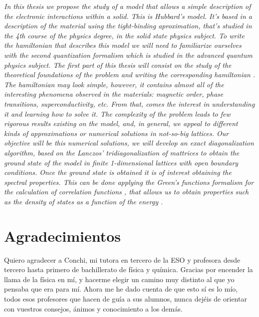 \documentclass[12pt,twoside]{article}
\begin{document}
\emph{In this thesis we propose the study of a model that allows a simple description of the electronic interactions within a solid. This is Hubbard's model. It's based in a description of the material using the tight-binding aproximation, that's studied in the 4th course of the physics degree, in the solid state physics subject. To write the hamiltonian that describes this model we will need to familiarize ourselves with the second quantization formalism which is studied in the advanced quantum physics subject. The first part of this thesis will consist on the study of the theoretical foundations of the problem and writing the corresponding hamiltonian \cite{alma9947259002101}. The hamiltonian may look simple, however, it contains almost all of the interesting phenomena observed in the materials: magnetic order, phase transitions, superconductivity, etc. From that, comes the interest in understanding it and learning how to solve it. The complexity of the problem leads to few rigorous results existing on the model, and, in general, we appeal to different kinds of approximations or numerical solutions in not-so-big lattices. Our objective will be this numerical solutions, we will develop an exact diagonalization algorithm, based on the Lanczos' tridiagonalization of mattrices to obtain the ground state of the model in finite 1-dimensional lattices with open boundary conditions. Once the ground state is obtained it is of interest obtaining the spectral properties. This can be done applying the Green's functions formalism for the calculation of correlation functions \cite{fetter2003quantum}, that allows us to obtain properties such as the density of states as a function of the energy \cite{RevModPhys.66.763}.}

\newpage

\section*{Agradecimientos}

Quiero agradecer a Conchi, mi tutora en tercero de la ESO y profesora desde tercero hasta primero de bachillerato de física y química. Gracias por encender la llama de la física en mí, y hacerme elegir un camino muy distinto al que yo pensaba que era para mí. Ahora me he dado cuenta de que esto sí es lo mío, todos esos profesores que hacen de guía a sus alumnos, nunca dejéis de orientar con vuestros consejos, ánimos y conocimiento a los demás.
\end{document}
